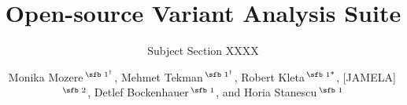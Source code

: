 \documentclass{assets/biotemplate/bioinfo}
\numberwithin{equation}{section}
\begin{document}

\subtitle{Subject Section XXXX}

\title[OVAS]{Open-source Variant Analysis Suite}
\author[Mozere \textit{et~al}.]{Monika Mozere\,$^{\text{\sfb 1\dag}}$, Mehmet Tekman\,$^{\text{\sfb 1\dag}}$, Robert Kleta\,$^{\text{\sfb 1*}}$, [JAMELA]\,$^{\text{\sfb 2}}$, Detlef Bockenhauer\,$^{\text{\sfb 1}}$, and Horia Stanescu\,$^{\text{\sfb 1}}$}
\address{$^{\text{\sf 1}}$Division of Medicine, University College London,  London,  NW3 2PF, UK\\\
$^{\text{\sf 2}}$Jamela, Jamela, Jamela}






\maketitle









\vspace{-15pt}

\end{document}
